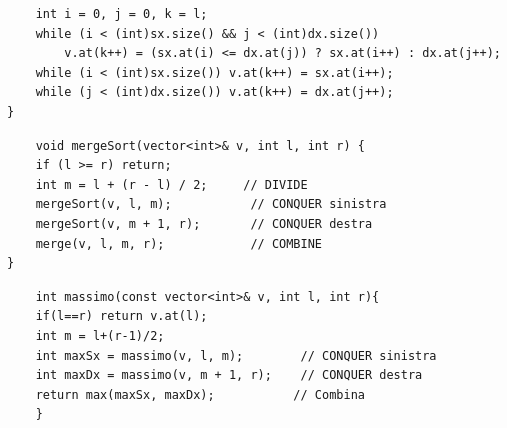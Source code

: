 \begin{codeexample}
\begin{codebox}
\begin{lstlisting}
    int i = 0, j = 0, k = l;
    while (i < (int)sx.size() && j < (int)dx.size())
        v.at(k++) = (sx.at(i) <= dx.at(j)) ? sx.at(i++) : dx.at(j++);
    while (i < (int)sx.size()) v.at(k++) = sx.at(i++);
    while (j < (int)dx.size()) v.at(k++) = dx.at(j++);
}
    \end{lstlisting}
    \end{codebox}






    \begin{codebox}
    \begin{lstlisting}
    void mergeSort(vector<int>& v, int l, int r) {
    if (l >= r) return;
    int m = l + (r - l) / 2;     // DIVIDE
    mergeSort(v, l, m);           // CONQUER sinistra
    mergeSort(v, m + 1, r);       // CONQUER destra
    merge(v, l, m, r);            // COMBINE
}
    \end{lstlisting}
    \end{codebox}
\end{codeexample}


\begin{codeexample}[Massimo]
    \begin{codebox}
    \begin{lstlisting}
    int massimo(const vector<int>& v, int l, int r){
    if(l==r) return v.at(l);
    int m = l+(r-1)/2;
    int maxSx = massimo(v, l, m);        // CONQUER sinistra
    int maxDx = massimo(v, m + 1, r);    // CONQUER destra
    return max(maxSx, maxDx);           // Combina 
    }
    \end{lstlisting}
    \end{codebox}
\end{codeexample}




